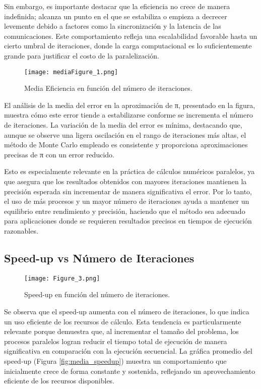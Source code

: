 \documentclass[conference, a4paper]{IEEEtran}
\begin{document}
Sin embargo, es importante destacar que la eficiencia no crece de manera indefinida; alcanza un punto en el que se estabiliza o empieza a decrecer levemente debido a factores como la sincronización y la latencia de las comunicaciones. Este comportamiento refleja una escalabilidad favorable hasta un cierto umbral de iteraciones, donde la carga computacional es lo suficientemente grande para justificar el costo de la paralelización.

\begin{figure}[h!]
    \centering
    \texttt{[image: mediaFigure\_1.png]}
    \caption{Media Eficiencia en función del número de iteraciones.}
    \label{fig:eficiencia}
\end{figure}

El análisis de la media del error en la aproximación de π, presentado en la figura, muestra cómo este error tiende a estabilizarse conforme se incrementa el número de iteraciones. La variación de la media del error es mínima, destacando que, aunque se observe una ligera oscilación en el rango de iteraciones más altas, el método de Monte Carlo empleado es consistente y proporciona aproximaciones precisas de π con un error reducido. 

Esto es especialmente relevante en la práctica de cálculos numéricos paralelos, ya que asegura que los resultados obtenidos con mayores iteraciones mantienen la precisión esperada sin incrementar de manera significativa el error. Por lo tanto, el uso de más procesos y un mayor número de iteraciones ayuda a mantener un equilibrio entre rendimiento y precisión, haciendo que el método sea adecuado para aplicaciones donde se requieren resultados precisos en tiempos de ejecución razonables.

\subsection{Speed-up vs Número de Iteraciones}
\begin{figure}[h!]
    \centering
    \texttt{[image: Figure\_3.png]}
    \caption{Speed-up en función del número de iteraciones.}
    \label{fig:speedup}
\end{figure}

Se observa que el speed-up aumenta con el número de iteraciones, lo que indica un uso eficiente de los recursos de cálculo. Esta tendencia es particularmente relevante porque demuestra que, al incrementar el tamaño del problema, los procesos paralelos logran reducir el tiempo total de ejecución de manera significativa en comparación con la ejecución secuencial. La gráfica promedio del speed-up (Figura \ref{fig:media_speedup}) muestra un comportamiento que inicialmente crece de forma constante y sostenida, reflejando un aprovechamiento eficiente de los recursos disponibles.
\end{document}
